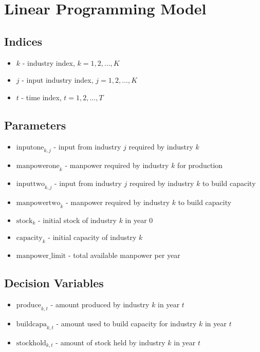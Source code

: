 \documentclass{article}
\begin{document}
\section*{Linear Programming Model}

\subsection*{Indices}
\begin{itemize}
    \item \( k \) - industry index, \( k = 1, 2, \ldots, K \)
    \item \( j \) - input industry index, \( j = 1, 2, \ldots, K \)
    \item \( t \) - time index, \( t = 1, 2, \ldots, T \)
\end{itemize}

\subsection*{Parameters}
\begin{itemize}
    \item \( \text{inputone}_{k, j} \) - input from industry \( j \) required by industry \( k \)
    \item \( \text{manpowerone}_{k} \) - manpower required by industry \( k \) for production
    \item \( \text{inputtwo}_{k, j} \) - input from industry \( j \) required by industry \( k \) to build capacity
    \item \( \text{manpowertwo}_{k} \) - manpower required by industry \( k \) to build capacity
    \item \( \text{stock}_{k} \) - initial stock of industry \( k \) in year 0
    \item \( \text{capacity}_{k} \) - initial capacity of industry \( k \)
    \item \( \text{manpower\_limit} \) - total available manpower per year
\end{itemize}

\subsection*{Decision Variables}
\begin{itemize}
    \item \( \text{produce}_{k, t} \) - amount produced by industry \( k \) in year \( t \)
    \item \( \text{buildcapa}_{k, t} \) - amount used to build capacity for industry \( k \) in year \( t \)
    \item \( \text{stockhold}_{k, t} \) - amount of stock held by industry \( k \) in year \( t \)
\end{itemize}
\end{document}
